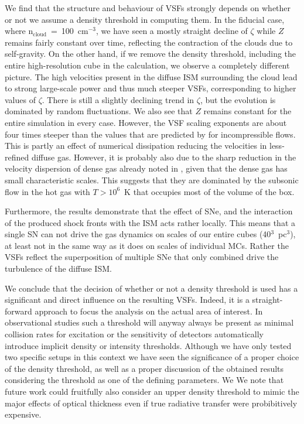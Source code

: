 \documentclass{aa}		%
\begin{document}
We find that the structure and behaviour of VSFs strongly depends on whether or not we assume a density threshold in computing them.
In the fiducial case, where n$_\mathrm{cloud}$~=~100~cm$^{-3}$, we have seen a mostly straight decline of $\zeta$ while $Z$ remains fairly constant over time, reflecting the contraction of the clouds due to self-gravity.
On the other hand, if we remove the density threshold, including the entire high-resolution cube in the calculation, we observe a completely different picture.
The high velocities present in the diffuse ISM surrounding the cloud lead to strong large-scale power and thus much steeper VSFs, corresponding to higher values of $\zeta$. 
There is still a slightly declining trend in $\zeta$, but the evolution is dominated by random fluctuations.
We also see that $Z$ remains constant for the entire simulation in every case.
However, the VSF scaling exponents are about four times steeper than the values that are predicted by \citep{Boldyrev2002} for incompressible flows.
This is partly an effect of numerical dissipation reducing the velocities in less-refined diffuse gas.
However, it is probably also due to the sharp reduction in the velocity dispersion of dense gas already noted in , given that the dense gas has small characteristic scales.
This suggests that they are dominated by the subsonic flow in the hot gas with $T > 10^6$~K that occupies most of the volume of the box.

Furthermore, the results demonstrate that the effect of SNe, and the interaction of the produced shock fronts with the ISM acts rather locally. 
This means that a single SN can not drive the gas dynamics on scales of our entire cubes (40$^3$~pc$^3$), at least not in the same way as it does on scales of individual MCs.
Rather the VSFs reflect the superposition of multiple SNe that only combined drive the turbulence of the diffuse ISM.

We conclude that the decision of whether or not a density threshold is used has a significant and direct influence on the resulting VSFs.
Indeed, it is a straight-forward approach to focus the analysis on the actual area of interest.
In observational studies such a threshold will anyway always be present as minimal collision rates for excitation or the sensitivity of detectors automatically introduce implicit density or intensity thresholds. 
Although we have only tested two specific setups in this context we have seen the significance of a proper choice of the density threshold, as well as a proper discussion of the obtained results considering the threshold as one of the defining parameters.
We We note that future work could fruitfully also consider an upper density threshold to mimic the major effects of optical thickness even if true radiative transfer were probibitively expensive.
\end{document}
